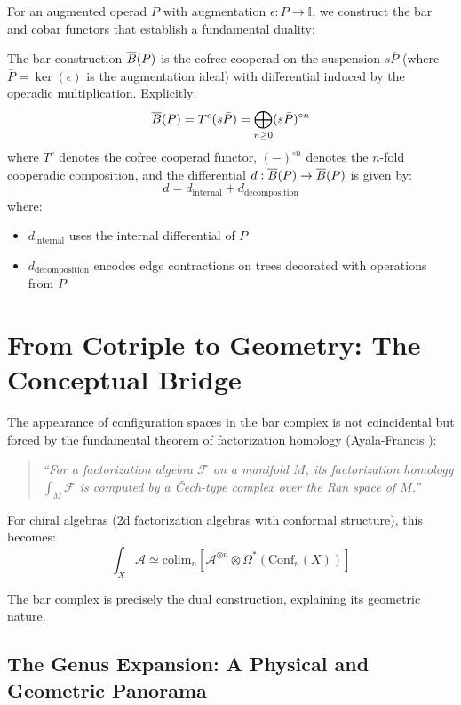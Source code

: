 For an augmented operad $P$ with augmentation $\epsilon : P \to \mathbb{I}$, we construct the bar and cobar functors that establish a fundamental duality:
 
\begin{definition}
The bar construction $\overline{B}(P)$ is the cofree cooperad on the suspension $s\bar{P}$ (where $\bar{P} = \ker(\epsilon)$ is the augmentation ideal) with differential induced by the operadic multiplication. Explicitly:
\[
\overline{B}(P) = T^c(s\bar{P}) = \bigoplus_{n \geq 0} (s\bar{P})^{\circ n}
\]
where $T^c$ denotes the cofree cooperad functor, $(-)^{\circ n}$ denotes the $n$-fold cooperadic composition,
and the differential $d: \overline{B}(P) \to \overline{B}(P)$ is given by:
\[
d = d_{\text{internal}} + d_{\text{decomposition}}
\]
where:
\begin{itemize}
\item $d_{\text{internal}}$ uses the internal differential of $P$
\item $d_{\text{decomposition}}$ encodes edge contractions on trees decorated with operations from $P$
\end{itemize}
\end{definition}

\section{From Cotriple to Geometry: The Conceptual Bridge}

\begin{remark}
The appearance of configuration spaces in the bar complex is not coincidental but forced by the 
fundamental theorem of factorization homology (Ayala-Francis \cite{AF}):

\begin{quote}
\emph{``For a factorization algebra $\mathcal{F}$ on a manifold $M$, its factorization homology 
$\int_M \mathcal{F}$ is computed by a Čech-type complex over the Ran space of $M$.''}
\end{quote}

For chiral algebras (2d factorization algebras with conformal structure), this becomes:
$$\int_X \mathcal{A} \simeq \text{colim}_{n} \left[ \mathcal{A}^{\otimes n} \otimes \Omega^*(\text{Conf}_n(X)) \right]$$

The bar complex is precisely the dual construction, explaining its geometric nature.
\end{remark}

\subsection{The Genus Expansion: A Physical and Geometric Panorama}
\label{sec:genus_expansion_panorama}

